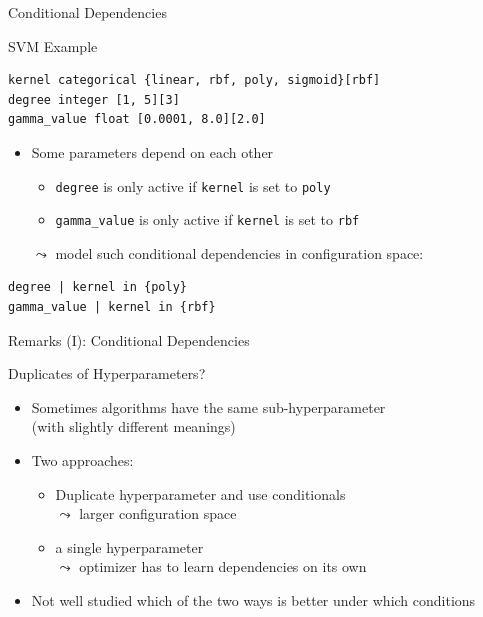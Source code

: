 \begin{frame}[c, fragile]{Conditional Dependencies}

\begin{block}{SVM Example}
\begin{verbatim}
kernel categorical {linear, rbf, poly, sigmoid}[rbf]
degree integer [1, 5][3]
gamma_value float [0.0001, 8.0][2.0]
\end{verbatim}
\end{block}

\begin{itemize}
  \item Some parameters depend on each other
  \begin{itemize}
    \item \texttt{degree} is only active if \texttt{kernel} is set to \texttt{poly}
    \item \texttt{gamma\_value} is only active if \texttt{kernel} is set to \texttt{rbf}  
  \end{itemize}
  \bigskip
  \pause
  \item[$\leadsto$] model such conditional dependencies in configuration space:
\end{itemize}

\begin{verbatim}
degree | kernel in {poly}
gamma_value | kernel in {rbf}
\end{verbatim}

\end{frame}
\begin{frame}[c, fragile]{Remarks (I): Conditional Dependencies}

\begin{block}{Duplicates of Hyperparameters?}
\begin{itemize}
	\item Sometimes algorithms have the same sub-hyperparameter\\ (with slightly different meanings)
	\item Two approaches:
	\begin{itemize}
		\item Duplicate hyperparameter and use conditionals \\
		$\leadsto$ larger configuration space
		\item a single hyperparameter\\
		$\leadsto$ optimizer has to learn dependencies on its own
	\end{itemize}
    \item Not well studied which of the two ways is better under which conditions
\end{itemize}
\end{block}
	
\end{frame}
